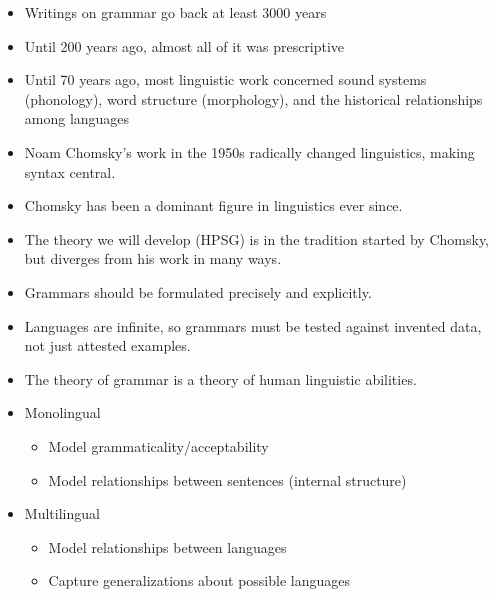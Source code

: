 \documentclass[a4paper,landscape,headrule,footrule]{foils}
\begin{document}
\begin{itemize}
\item Writings on grammar go back at least 3000 years
\item Until 200 years ago, almost all of it was prescriptive
\item Until 70 years ago, most linguistic work concerned sound systems (phonology),
word structure (morphology), and the historical relationships among
languages
\end{itemize}

\begin{itemize}
\item Noam Chomsky’s work in the 1950s
radically changed linguistics, making
syntax central.
\item Chomsky has been a dominant figure
in linguistics ever since.
\item The theory we will develop (HPSG) is in the
tradition started by Chomsky, but
diverges from his work in many ways.
\end{itemize}

\begin{itemize}
\item Grammars should be formulated precisely
and explicitly.
\item Languages are infinite, so grammars must be
tested against invented data, not just attested
examples.
\item The theory of grammar is a theory of human
linguistic abilities.
\end{itemize}

\begin{itemize}
\item Monolingual
\begin{itemize}
\item Model grammaticality/acceptability
\item Model relationships between sentences
(internal structure)
\end{itemize}
\item Multilingual
\begin{itemize}
\item Model relationships between languages
\item Capture generalizations about possible
languages
\end{itemize}
\end{itemize}
\end{document}
